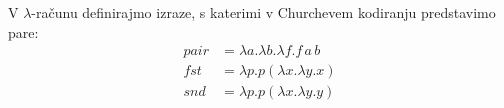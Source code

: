 \documentclass[arhiv]{../izpit}
\begin{document}
\newcommand{\bnfis}{\mathrel{{:}{:}{=}}}
\newcommand{\bnfor}{\;\mid\;}
\newcommand{\fun}[2]{\lambda #1. #2}
\newcommand{\conditional}[3]{\mathtt{if}\;#1\;\mathtt{then}\;#2\;\mathtt{else}\;#3}
\newcommand{\whileloop}[2]{\mathtt{while}\;#1\;\mathtt{do}\;#2}
\newcommand{\recfun}[3]{\mathtt{rec}\;#1\;#2. #3}
\newcommand{\boolty}{\mathtt{bool}}
\newcommand{\intty}{\mathtt{int}}
\newcommand{\funty}[2]{#1 \to #2}
\newcommand{\tru}{\mathtt{true}}
\newcommand{\fls}{\mathtt{false}}
\newcommand{\unt}{\hbox{\texttt{()}}}
\newcommand{\tbool}{\mathtt{bool}}
\newcommand{\tand}{\mathbin{\mathtt{and}}}
\newcommand{\tandalso}{\mathbin{\mathtt{andalso}}}
\newcommand{\imp}{\textsc{imp}}
\newcommand{\skp}{\mathtt{skip}}
\newcommand{\itp}[1]{\llbracket #1 \rrbracket}
\makeatletter
\newcommand{\nadaljevanje}{\dodatek{\newpage\noindent\emph{(\@sloeng{nadaljevanje rešitve \arabic{naloga}. naloge}{continuation of the answer to question \arabic{naloga}})}}}
\makeatother
{}


\naloga[\tocke{20}]

V $\lambda$-računu definirajmo izraze, s katerimi v Churchevem kodiranju predstavimo pare:
\begin{align*}
  \mathit{pair} & = \fun{a} \fun{b} \fun{f} f \, a \, b \\
  \mathit{fst}  & = \fun{p} p (\fun{x} \fun{y} x)       \\
  \mathit{snd}  & = \fun{p} p (\fun{x} \fun{y} y)
\end{align*}
\end{document}
